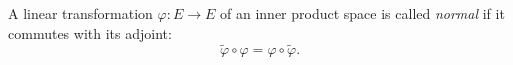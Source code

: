 A linear transformation $\varphi: E \rightarrow E$ of an inner product space is called \textit{normal} if it commutes with its adjoint:
$$\tilde{\varphi} \circ \varphi = \varphi \circ \tilde{\varphi}.$$
